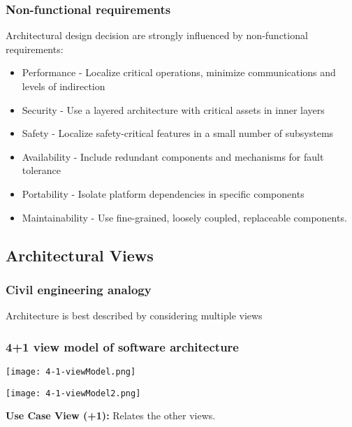 \documentclass[../ESOF_notes.tex]{subfiles}
\begin{document}
\subsubsection{Non-functional requirements}
Architectural design decision are strongly influenced by non-functional requirements:
\begin{itemize}
    \item Performance - Localize critical operations, minimize communications and levels of indirection
    \item Security - Use a layered architecture with critical assets in inner layers
    \item Safety - Localize safety-critical features in a small number of subsystems
    \item Availability - Include redundant components and mechanisms for fault tolerance
    \item Portability - Isolate platform dependencies in specific components
    \item Maintainability - Use fine-grained, loosely coupled, replaceable components.
\end{itemize}

\subsection{Architectural Views}

\subsubsection{Civil engineering analogy}
Architecture is best described by considering multiple views

\subsubsection{4+1 view model of software architecture}
\begin{center}
    \texttt{[image: 4-1-viewModel.png]}
\end{center}
\begin{center}
    \texttt{[image: 4-1-viewModel2.png]}
\end{center}
\textbf{Use Case View (+1):} Relates the other views.
\end{document}
